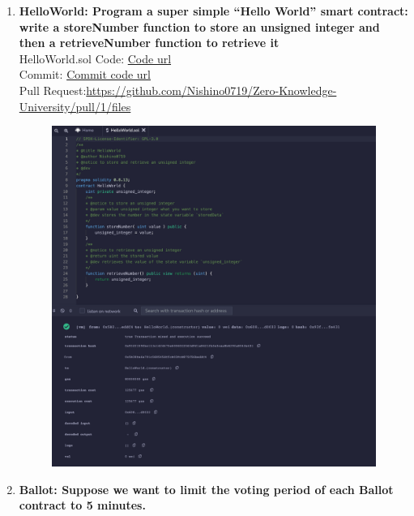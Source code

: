 \documentclass[a4paper,10pt]{jsarticle}
\begin{document}
  \begin{enumerate}
    \item \textbf{\large{HelloWorld: Program a super simple “Hello World” smart contract: write a storeNumber function to store an unsigned integer and then a retrieveNumber function to retrieve it}}\mbox{}\\
    HelloWorld.sol
    \newline
    Code: \href{https://github.com/Nishino0719/Zero-Knowledge-University/blob/main/BackgroundAssignment/B/HelloWorld.sol}{Code url}\mbox{}\\
    Commit: \href{https://github.com/Nishino0719/Zero-Knowledge-University/commit/f55562e393d832ccb38954473f5d72c46b3ef8be}{Commit code url}\mbox{}\\
    Pull Request:\href{https://github.com/Nishino0719/Zero-Knowledge-University/pull/1/files}{https://github.com/Nishino0719/Zero-Knowledge-University/pull/1/files}
    \begin{figure}[h]
        \includegraphics[width=\linewidth]{HelloWorld.png}
    \end{figure}
    \newpage
    \item \textbf{\large{Ballot: Suppose we want to limit the voting period of each Ballot contract to 5 minutes.}}\mbox{}\\

\end{enumerate}
\end{document}
